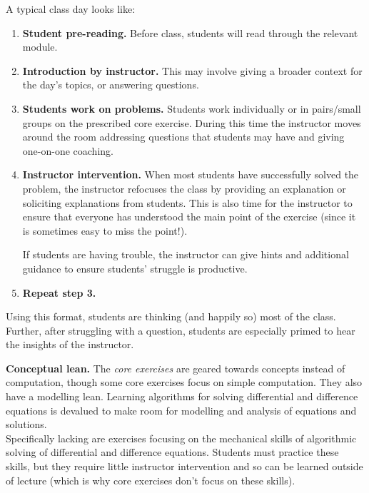 A typical class day looks like:
\begin{enumerate}
	\item {\bf Student pre-reading.} Before class, students will read through the relevant module.

	\item {\bf Introduction by instructor.} This may involve giving 	a broader context for the day's topics, or answering questions.

	\item {\bf Students work on problems.} Students work individually or in pairs/small groups
		on the prescribed core exercise. During this time the instructor moves
		around the room addressing questions that students may have and giving
		one-on-one coaching.

	\item {\bf Instructor intervention.} When most students have successfully solved
		the problem, the instructor refocuses the class by providing an
		explanation or soliciting explanations from students.
		This is also time for the instructor to ensure that everyone has
		understood the main point of the exercise (since it is sometimes
		easy to miss the point!).

		If students are having trouble, the instructor can give hints
		and additional guidance to ensure students' struggle is productive.

	\item {\bf Repeat step 3.}
\end{enumerate}

Using this format, students are thinking (and happily so) most of the class. Further,
after struggling with a question, students are especially primed to hear the insights of the instructor.

{\bf Conceptual lean.}
The \emph{core exercises} are geared towards concepts instead of computation, though some core exercises focus on simple computation. They also have a modelling lean. 
Learning algorithms for solving differential and difference equations is devalued to make room for modelling and analysis of equations and solutions. \\

Specifically lacking are exercises focusing on the mechanical skills of algorithmic solving of differential and difference equations. Students must practice these skills, but they require little instructor intervention and so can be learned outside of lecture (which is why core exercises don't focus on these skills).

